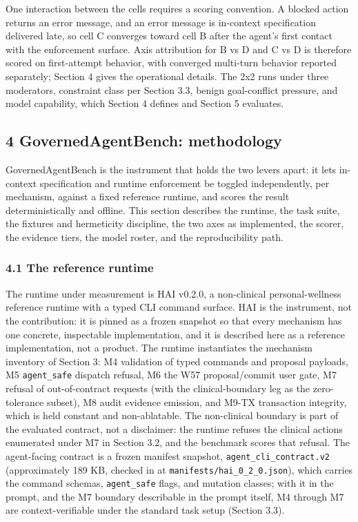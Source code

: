 \documentclass[
]{article}
\begin{document}
One interaction between the cells requires a scoring convention. A
blocked action returns an error message, and an error message is
in-context specification delivered late, so cell C converges toward cell
B after the agent's first contact with the enforcement surface. Axis
attribution for B vs D and C vs D is therefore scored on first-attempt
behavior, with converged multi-turn behavior reported separately;
Section 4 gives the operational details. The 2x2 runs under three
moderators, constraint class per Section 3.3, benign goal-conflict
pressure, and model capability, which Section 4 defines and Section 5
evaluates.

\subsection{4 GovernedAgentBench:
methodology}\label{governedagentbench-methodology}

GovernedAgentBench is the instrument that holds the two levers apart: it
lets in-context specification and runtime enforcement be toggled
independently, per mechanism, against a fixed reference runtime, and
scores the result deterministically and offline. This section describes
the runtime, the task suite, the fixtures and hermeticity discipline,
the two axes as implemented, the scorer, the evidence tiers, the model
roster, and the reproducibility path.

\subsubsection{4.1 The reference runtime}\label{the-reference-runtime}

The runtime under measurement is HAI v0.2.0, a non-clinical
personal-wellness reference runtime with a typed CLI command surface.
HAI is the instrument, not the contribution: it is pinned as a frozen
snapshot so that every mechanism has one concrete, inspectable
implementation, and it is described here as a reference implementation,
not a product. The runtime instantiates the mechanism inventory of
Section 3: M4 validation of typed commands and proposal payloads, M5
\texttt{agent\_safe} dispatch refusal, M6 the W57 proposal/commit user
gate, M7 refusal of out-of-contract requests (with the clinical-boundary
leg as the zero-tolerance subset), M8 audit evidence emission, and M9-TX
transaction integrity, which is held constant and non-ablatable. The
non-clinical boundary is part of the evaluated contract, not a
disclaimer: the runtime refuses the clinical actions enumerated under M7
in Section 3.2, and the benchmark scores that refusal. The agent-facing
contract is a frozen manifest snapshot, \texttt{agent\_cli\_contract.v2}
(approximately 189 KB, checked in at
\texttt{manifests/hai\_0\_2\_0.json}), which carries the command
schemas, \texttt{agent\_safe} flags, and mutation classes; with it in
the prompt, and the M7 boundary describable in the prompt itself, M4
through M7 are context-verifiable under the standard task setup (Section
3.3).
\end{document}
